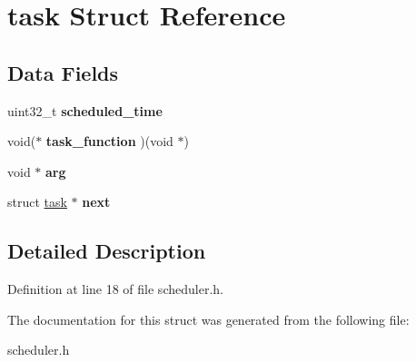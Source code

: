 \hypertarget{structtask}{\section{task Struct Reference}
\label{structtask}
}
\subsection*{Data Fields}
\begin{DoxyCompactItemize}
\item 
\hypertarget{structtask_ac0adede9ad64c43792e75c83835391ba}{uint32\+\_\+t {\bfseries scheduled\+\_\+time}}\label{structtask_ac0adede9ad64c43792e75c83835391ba}

\item 
\hypertarget{structtask_a40c2cc452b087d9516e89e908b653901}{void($\ast$ {\bfseries task\+\_\+function} )(void $\ast$)}\label{structtask_a40c2cc452b087d9516e89e908b653901}

\item 
\hypertarget{structtask_afed8e0ce3a29933d1ccf4dd4cc33c671}{void $\ast$ {\bfseries arg}}\label{structtask_afed8e0ce3a29933d1ccf4dd4cc33c671}

\item 
\hypertarget{structtask_a3f2c7149983c28824baf1aebdfa7af98}{struct \hyperlink{structtask}{task} $\ast$ {\bfseries next}}\label{structtask_a3f2c7149983c28824baf1aebdfa7af98}

\end{DoxyCompactItemize}


\subsection{Detailed Description}


Definition at line 18 of file scheduler.\+h.



The documentation for this struct was generated from the following file\+:\begin{DoxyCompactItemize}
\item 
scheduler.\+h\end{DoxyCompactItemize}

